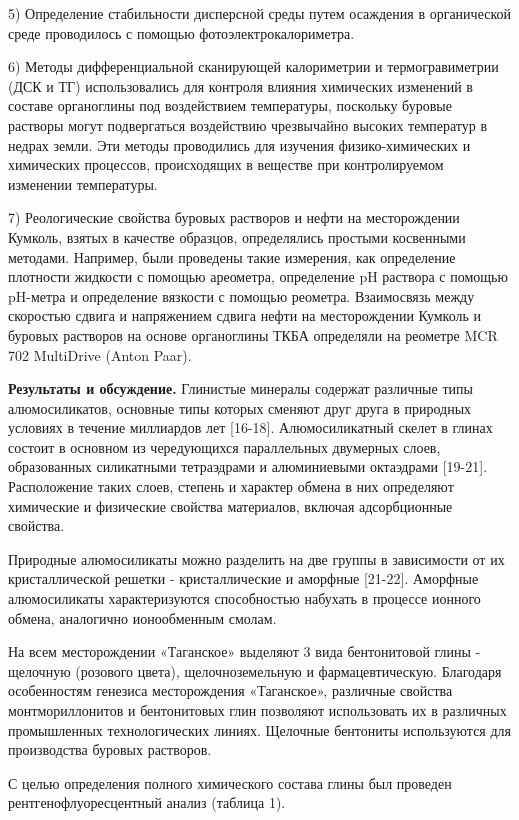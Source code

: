 5) Определение стабильности дисперсной среды путем осаждения в
органической среде проводилось с помощью фотоэлектрокалориметра.

6) Методы дифференциальной сканирующей калориметрии и термогравиметрии
(ДСК и ТГ) использовались для контроля влияния химических изменений в
составе органоглины под воздействием температуры, поскольку буровые
растворы могут подвергаться воздействию чрезвычайно высоких температур в
недрах земли. Эти методы проводились для изучения физико-химических и
химических процессов, происходящих в веществе при контролируемом
изменении температуры.

7) Реологические свойства буровых растворов и нефти на месторождении
Кумколь, взятых в качестве образцов, определялись простыми косвенными
методами. Например, были проведены такие измерения, как определение
плотности жидкости с помощью ареометра, определение pH раствора с
помощью pH-метра и определение вязкости с помощью реометра. Взаимосвязь
между скоростью сдвига и напряжением сдвига нефти на месторождении
Кумколь и буровых растворов на основе органоглины ТКБА определяли на
реометре MCR 702 MultiDrive (Anton Paar).

\textbf{Результаты и обсуждение.} Глинистые минералы содержат различные
типы алюмосиликатов, основные типы которых сменяют друг друга в
природных условиях в течение миллиардов лет {[}16-18{]}. Алюмосиликатный
скелет в глинах состоит в основном из чередующихся параллельных
двумерных слоев, образованных силикатными тетраэдрами и алюминиевыми
октаэдрами {[}19-21{]}. Расположение таких слоев, степень и характер
обмена в них определяют химические и физические свойства материалов,
включая адсорбционные свойства.

Природные алюмосиликаты можно разделить на две группы в зависимости от
их кристаллической решетки - кристаллические и аморфные {[}21-22{]}.
Аморфные алюмосиликаты характеризуются способностью набухать в процессе
ионного обмена, аналогично ионообменным смолам.

На всем месторождении «Таганское» выделяют 3 вида бентонитовой глины -
щелочную (розового цвета), щелочноземельную и фармацевтическую.
Благодаря особенностям генезиса месторождения «Таганское», различные
свойства монтмориллонитов и бентонитовых глин позволяют использовать их
в различных промышленных технологических линиях. Щелочные бентониты
используются для производства буровых растворов.

С целью определения полного химического состава глины был проведен
рентгенофлуоресцентный анализ (таблица 1).

